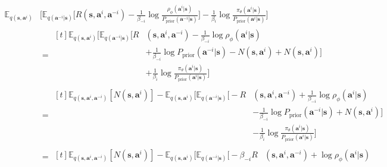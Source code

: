 \begin{equation*}
    \begin{aligned}
        \mathbb{E}_{q(\boldsymbol{s}, \boldsymbol{a}^i)}&\bigg[ \mathbb{E}_{q(\boldsymbol{a}^{-i} | \boldsymbol{s})} \bigg[ R(\boldsymbol{s}, \boldsymbol{a}^i, \boldsymbol{a}^{-i}) - \frac{1}{\beta_{-i}}\log \frac{\rho_{\phi}(\boldsymbol{a}^i | \boldsymbol{s})}{P_{\text{prior}}(\boldsymbol{a}^{-i} | \boldsymbol{s})}  \bigg] - \frac{1}{\beta_{i}}\log \frac{\pi_{\theta}(\boldsymbol{a}^i | \boldsymbol{s})}{P_{\text{prior}}(\boldsymbol{a}^i | \boldsymbol{s})} \bigg] \\
        &= \begin{aligned}[t]
            \mathbb{E}_{q(\boldsymbol{s}, \boldsymbol{a}^i)} \bigg[ \mathbb{E}_{q(\boldsymbol{a}^{-i} | \boldsymbol{s})} \bigg[ R&(\boldsymbol{s}, \boldsymbol{a}^i, \boldsymbol{a}^{-i}) - \frac{1}{\beta_{-i}}\log \rho_{\phi}(\boldsymbol{a}^i | \boldsymbol{s})  \\
            &+\frac{1}{\beta_{-i}} \log P_{\text{prior}}(\boldsymbol{a}^{-i} | \boldsymbol{s}) - N(\boldsymbol{s}, \boldsymbol{a}^{i}) + N(\boldsymbol{s}, \boldsymbol{a}^{i}) \bigg] \\
            &+\frac{1}{\beta_{i}}\log \frac{\pi_{\theta}(\boldsymbol{a}^i | \boldsymbol{s})}{P_{\text{prior}}(\boldsymbol{a}^i | \boldsymbol{s})} \bigg]
        \end{aligned} \\
        &= \begin{aligned}[t]
            \mathbb{E}_{q(\boldsymbol{s}, \boldsymbol{a}^i, \boldsymbol{a}^{-i})}[N(\boldsymbol{s}, \boldsymbol{a}^i)] - \mathbb{E}_{q(\boldsymbol{s}, \boldsymbol{a}^i)} \bigg[ \mathbb{E}_{q(\boldsymbol{a}^{-i} | \boldsymbol{s})} \bigg[ -R&(\boldsymbol{s}, \boldsymbol{a}^i, \boldsymbol{a}^{-i}) + \frac{1}{\beta_{-i}}\log \rho_{\phi}(\boldsymbol{a}^i | \boldsymbol{s})  \\
            &-\frac{1}{\beta_{-i}} \log P_{\text{prior}}(\boldsymbol{a}^{-i} | \boldsymbol{s})+ N(\boldsymbol{s}, \boldsymbol{a}^{i}) \bigg] \\
            &-\frac{1}{\beta_{i}}\log \frac{\pi_{\theta}(\boldsymbol{a}^i | \boldsymbol{s})}{P_{\text{prior}}(\boldsymbol{a}^i | \boldsymbol{s})}\bigg]
        \end{aligned} \\
        &= \begin{aligned}[t]
            \mathbb{E}_{q(\boldsymbol{s}, \boldsymbol{a}^i, \boldsymbol{a}^{-i})}[N(\boldsymbol{s}, \boldsymbol{a}^i)] - \mathbb{E}_{q(\boldsymbol{s}, \boldsymbol{a}^i)} \bigg[ \mathbb{E}_{q(\boldsymbol{a}^{-i} | \boldsymbol{s})} \bigg[ -\beta_{-i} R&(\boldsymbol{s}, \boldsymbol{a}^i, \boldsymbol{a}^{-i}) + \log \rho_{\phi}(\boldsymbol{a}^i | \boldsymbol{s})  \\

\end{aligned}
\end{aligned}
\end{equation*}
